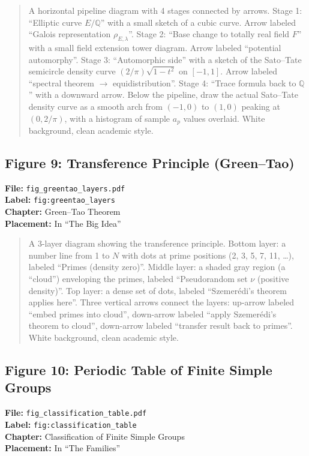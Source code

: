 \begin{quote}
A horizontal pipeline diagram with 4 stages connected by arrows. Stage 1: ``Elliptic curve $E/\mathbb{Q}$'' with a small sketch of a cubic curve. Arrow labeled ``Galois representation $\rho_{E,\lambda}$''. Stage 2: ``Base change to totally real field $F$'' with a small field extension tower diagram. Arrow labeled ``potential automorphy''. Stage 3: ``Automorphic side'' with a sketch of the Sato--Tate semicircle density curve $(2/\pi)\sqrt{1{-}t^2}$ on $[-1,1]$. Arrow labeled ``spectral theorem $\to$ equidistribution''. Stage 4: ``Trace formula back to $\mathbb{Q}$'' with a downward arrow. Below the pipeline, draw the actual Sato--Tate density curve as a smooth arch from $(-1,0)$ to $(1,0)$ peaking at $(0, 2/\pi)$, with a histogram of sample $a_p$ values overlaid. White background, clean academic style.
\end{quote}

\subsection*{Figure 9: Transference Principle (Green--Tao)}
\textbf{File:} \texttt{fig\_greentao\_layers.pdf} \\
\textbf{Label:} \texttt{fig:greentao\_layers} \\
\textbf{Chapter:} Green--Tao Theorem \\
\textbf{Placement:} In ``The Big Idea''

\begin{quote}
A 3-layer diagram showing the transference principle. Bottom layer: a number line from 1 to $N$ with dots at prime positions (2, 3, 5, 7, 11, \ldots), labeled ``Primes (density zero)''. Middle layer: a shaded gray region (a ``cloud'') enveloping the primes, labeled ``Pseudorandom set $\nu$ (positive density)''. Top layer: a dense set of dots, labeled ``Szemer\'{e}di's theorem applies here''. Three vertical arrows connect the layers: up-arrow labeled ``embed primes into cloud'', down-arrow labeled ``apply Szemer\'{e}di's theorem to cloud'', down-arrow labeled ``transfer result back to primes''. White background, clean academic style.
\end{quote}

\subsection*{Figure 10: Periodic Table of Finite Simple Groups}
\textbf{File:} \texttt{fig\_classification\_table.pdf} \\
\textbf{Label:} \texttt{fig:classification\_table} \\
\textbf{Chapter:} Classification of Finite Simple Groups \\
\textbf{Placement:} In ``The Families''

